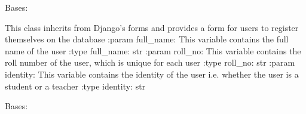 \documentclass[letterpaper,10pt,english]{sphinxmanual}
\begin{document}

\begin{fulllineitems}
\label{\detokenize{users:users.forms.UserProfileForm}}
\sphinxAtStartPar
Bases: 

\sphinxAtStartPar
This class inherits from Django’s forms and provides a form for users to register themselves on the database
:param full\_name: This variable contains the full name of the user
:type full\_name: str
:param roll\_no: This variable contains the roll number of the user, which is unique for each user
:type roll\_no: str
:param identity: This variable contains the identity of the user i.e. whether the user is a student or a teacher
:type identity: str

\begin{fulllineitems}
\label{\detokenize{users:users.forms.UserProfileForm.Meta}}
\sphinxAtStartPar
Bases: 

\begin{fulllineitems}
\label{\detokenize{users:users.forms.UserProfileForm.Meta.fields}}
\end{fulllineitems}


\end{fulllineitems}
\end{fulllineitems}
\end{document}
